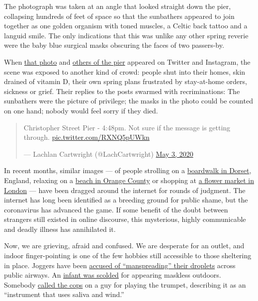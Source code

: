 The photograph was taken at an angle that looked straight down the pier,
collapsing hundreds of feet of space so that the sunbathers appeared to
join together as one golden organism with toned muscles, a Celtic back
tattoo and a languid smile. The only indications that this was unlike
any other spring reverie were the baby blue surgical masks obscuring the
faces of two passers-by.

When
\href{https://twitter.com/LachCartwright/status/1257049652559577096}{that
photo} and
\href{https://twitter.com/Welcome2theBX/status/1256763447209066496}{others
of the pier} appeared on Twitter and Instagram, the scene was exposed to
another kind of crowd: people shut into their homes, skin drained of
vitamin D, their own spring plans frustrated by stay-at-home orders,
sickness or grief. Their replies to the posts swarmed with
recriminations: The sunbathers were the picture of privilege; the masks
in the photo could be counted on one hand; nobody would feel sorry if
they died.

\begin{quote}
Christopher Street Pier - 4:48pm. Not sure if the message is getting
through. \href{https://t.co/RXNQ5pUWkn}{pic.twitter.com/RXNQ5pUWkn}

--- Lachlan Cartwright (@LachCartwright)
\href{https://twitter.com/LachCartwright/status/1257049652559577096?ref_src=twsrc\%5Etfw}{May
3, 2020}
\end{quote}

In recent months, similar images --- of people strolling on a
\href{https://twitter.com/alukeonlife/status/1254568419116175367?s=21}{boardwalk
in Dorset}, England, relaxing on a
\href{https://petapixel.com/2020/05/02/controversial-photo-of-crowds-on-ca-beach-was-shot-with-a-telephoto-lens/}{beach
in Orange County} or shopping at
\href{https://www.thecanary.co/trending/2020/03/22/selfish-reckless-members-of-the-british-public-are-still-rejecting-social-distancing-during-the-coronavirus-pandemic/}{a
flower market in London} --- have been dragged around the internet for
rounds of judgment. The internet has long been identified as a breeding
ground for public shame, but the coronavirus has advanced the game. If
some benefit of the doubt between strangers still existed in online
discourse, this mysterious, highly communicable and deadly illness has
annihilated it.

Now, we are grieving, afraid and confused. We are desperate for an
outlet, and indoor finger-pointing is one of the few hobbies still
accessible to those sheltering in place. Joggers have been
\href{https://www.independent.co.uk/life-style/women/manspreading-running-social-distancing-jogging-men-coronavirus-a9491926.html}{accused
of ``manspreading'' their droplets} across public airways. An
\href{https://twitter.com/naanking/status/1258219591177629697?s=12}{infant
was scolded} for appearing maskless outdoors. Somebody
\href{https://twitter.com/benyt/status/1256758795038085121}{called the
cops} on a guy for playing the trumpet, describing it as an ``instrument
that uses saliva and wind.''

